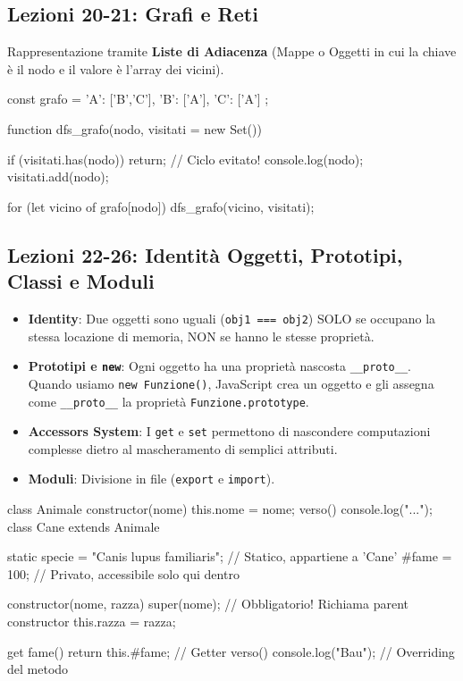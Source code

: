 \documentclass[a4paper,10pt]{article}
\begin{document}
\subsection{Lezioni 20-21: Grafi e Reti}
Rappresentazione tramite \textbf{Liste di Adiacenza} (Mappe o Oggetti in cui la chiave è il nodo e il valore è l'array dei vicini).
\begin{jsbox}[title={Snippet: Visita Grafo (DFS) con Set dei Visitati}]
const grafo = { 'A': ['B','C'], 'B': ['A'], 'C': ['A'] };

function dfs_grafo(nodo, visitati = new Set()) {
    if (visitati.has(nodo)) return; // Ciclo evitato!
    console.log(nodo);
    visitati.add(nodo);
    
    for (let vicino of grafo[nodo]) {
        dfs_grafo(vicino, visitati);
    }
}
\end{jsbox}

\subsection{Lezioni 22-26: Identità Oggetti, Prototipi, Classi e Moduli}
\begin{itemize}
    \item \textbf{Identity}: Due oggetti sono uguali (\texttt{obj1 === obj2}) SOLO se occupano la stessa locazione di memoria, NON se hanno le stesse proprietà.
    \item \textbf{Prototipi e \texttt{new}}: Ogni oggetto ha una proprietà nascosta \texttt{\_\_proto\_\_}. Quando usiamo \texttt{new Funzione()}, JavaScript crea un oggetto e gli assegna come \texttt{\_\_proto\_\_} la proprietà \texttt{Funzione.prototype}.
    \item \textbf{Accessors System}: I \texttt{get} e \texttt{set} permettono di nascondere computazioni complesse dietro al mascheramento di semplici attributi.
    \item \textbf{Moduli}: Divisione in file (\texttt{export} e \texttt{import}).
\end{itemize}

\begin{jsbox}[title={Snippet: Classi (ES6) ed Ereditarietà}]
class Animale {
    constructor(nome) { this.nome = nome; }
    verso() { console.log("..."); }
}
class Cane extends Animale {
    static specie = "Canis lupus familiaris"; // Statico, appartiene a 'Cane'
    #fame = 100;                              // Privato, accessibile solo qui dentro
    
    constructor(nome, razza) {
        super(nome); // Obbligatorio! Richiama parent constructor
        this.razza = razza;
    }
    
    get fame() { return this.#fame; } // Getter
    verso() { console.log("Bau"); } // Overriding del metodo
}
\end{jsbox}
\end{document}
